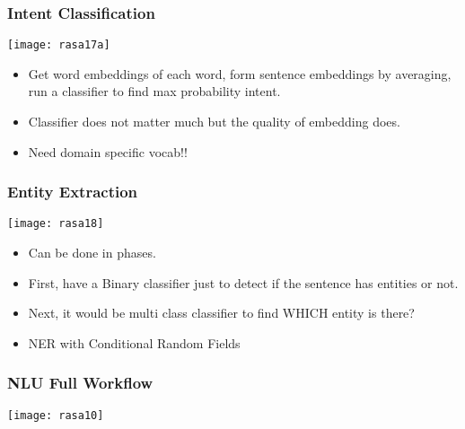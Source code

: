 \begin{frame}[fragile]\frametitle{Intent Classification}

\begin{center}
\texttt{[image: rasa17a]}
\end{center}

\begin{itemize}
\item Get word embeddings of each word, form sentence embeddings by averaging, run a classifier to find max probability intent.
\item Classifier does not matter much but the quality of embedding does.
\item Need domain specific vocab!!
\end{itemize}

\end{frame}


\begin{frame}[fragile]\frametitle{Entity Extraction}

\begin{center}
\texttt{[image: rasa18]}
\end{center}

\begin{itemize}
\item Can be done in phases.
\item First, have a Binary classifier just to detect if the sentence has entities or not.
\item Next, it would be multi class classifier to find WHICH entity is there?
\item NER with Conditional Random Fields
\end{itemize}
\end{frame}


\begin{frame}[fragile]\frametitle{NLU Full Workflow}


\begin{center}
\texttt{[image: rasa10]}
\end{center}

\end{frame}

